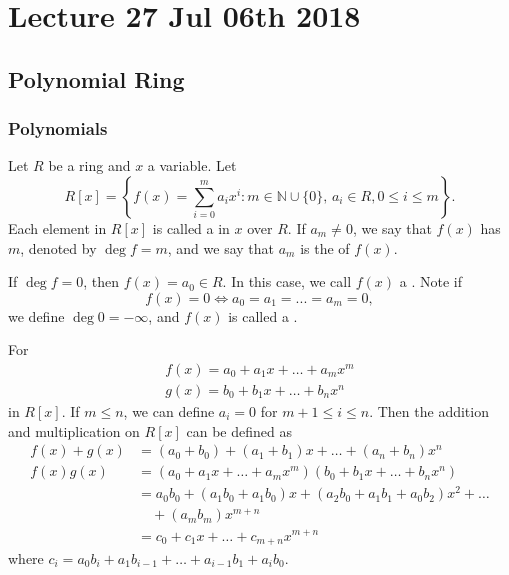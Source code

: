 \chapter{Lecture 27 Jul 06th 2018}%
\label{chp:lecture_27_jul_06th_2018}

\section{Polynomial Ring}%
\label{sec:polynomial_ring}

\subsection{Polynomials}%
\label{sub:polynomials}

\begin{defn}[Polynomials]
\label{defn:polynomials}
  Let $R$ be a ring and $x$ a variable. Let
  \begin{equation*}
    R[x] = \left\{ f(x) = \sum_{i=0}^{m} a_i x^i : m \in \mathbb{N} \cup \{0\}, \, a_i \in R, 0 \leq i \leq m \right\}.
  \end{equation*}
  Each element in $R[x]$ is called a  in $x$ over $R$. If $a_m \neq 0$, we say that $f(x)$ has  $m$, denoted by $\deg f = m$, and we say that $a_m$ is the  of $f(x)$.

  If $\deg f = 0$, then $f(x) = a_0 \in R$. In this case, we call $f(x)$ a . Note if
  \begin{equation*}
    f(x) = 0 \iff a_0 = a_1 = ... = a_m = 0,
  \end{equation*}
  we define $\deg 0 = - \infty$, and $f(x)$ is called a .
\end{defn}

For
\begin{gather*}
  f(x) = a_0 + a_1 x + \hdots + a_m x^m \\
  g(x) = b_0 + b_1 x + \hdots + b_n x^n
\end{gather*}
in $R[x]$. If $m \leq n$, we can define $a_i = 0$ for $m + 1 \leq i \leq n$. Then the addition and multiplication on $R[x]$ can be defined as
\begin{align*}
  f(x) + g(x) &= (a_0 + b_0) + (a_1 + b_1) x + \hdots + (a_n + b_n) x^n \\
  f(x) g(x) &= (a_0 + a_1 x + \hdots + a_m x^m) (b_0 + b_1 x + \hdots + b_n x^n) \\
            &= a_0 b_0 + (a_1 b_0 + a_1 b_0) x + (a_2 b_0 + a_1 b_1 + a_0 b_2) x^2 + \hdots \\
            &\quad + (a_m b_m) x^{m + n} \\
            &= c_0 + c_1 x + \hdots + c_{m + n} x^{m + n}
\end{align*}
where $c_i = a_0 b_i + a_1 b_{i - 1} + \hdots + a_{i - 1} b_1 + a_i b_0$.

